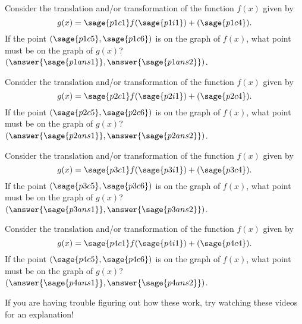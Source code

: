 \documentclass{ximera}
\begin{document}
\begin{problem}
    Consider the translation and/or transformation of the function $f(x)$ given by 
    \[
        g(x) = \sage{p1c1}f( \sage{p1i1} ) + (\sage{p1c4}).
    \] 
    If the point $(\sage{p1c5}, \sage{p1c6})$ is on the graph of $f(x)$, what point must be on the graph of $g(x)$? $(\answer{\sage{p1ans1}},\answer{\sage{p1ans2}})$.
\end{problem}


\begin{problem}
    Consider the translation and/or transformation of the function $f(x)$ given by 
    \[
        g(x) = \sage{p2c1}f( \sage{p2i1} ) + (\sage{p2c4}).
    \] 
    If the point $(\sage{p2c5}, \sage{p2c6})$ is on the graph of $f(x)$, what point must be on the graph of $g(x)$? $(\answer{\sage{p2ans1}},\answer{\sage{p2ans2}})$.
\end{problem}

\begin{problem}
    Consider the translation and/or transformation of the function $f(x)$ given by 
    \[
        g(x) = \sage{p3c1}f( \sage{p3i1} ) + (\sage{p3c4}).
    \] 
    If the point $(\sage{p3c5}, \sage{p3c6})$ is on the graph of $f(x)$, what point must be on the graph of $g(x)$? $(\answer{\sage{p3ans1}},\answer{\sage{p3ans2}})$.
\end{problem}

\begin{problem}
    Consider the translation and/or transformation of the function $f(x)$ given by 
    \[
        g(x) = \sage{p4c1}f( \sage{p4i1} ) + (\sage{p4c4}).
    \] 
    If the point $(\sage{p4c5}, \sage{p4c6})$ is on the graph of $f(x)$, what point must be on the graph of $g(x)$? $(\answer{\sage{p4ans1}},\answer{\sage{p4ans2}})$.
\end{problem}

If you are having trouble figuring out how these work, try watching these videos for an explanation!


\end{document}
